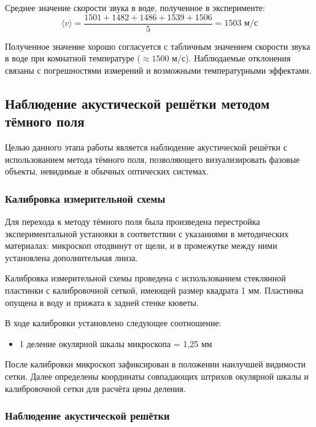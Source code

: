 Среднее значение скорости звука в воде, полученное в эксперименте:
\begin{equation}
    \langle v \rangle = \frac{1501 + 1482 + 1486 + 1539 + 1506}{5} = 1503 \text{ м/с}
\end{equation}

Полученное значение хорошо согласуется с табличным значением скорости звука в воде при комнатной температуре ($\approx 1500$ м/с). Наблюдаемые отклонения связаны с погрешностями измерений и возможными температурными эффектами.

\subsection{Наблюдение акустической решётки методом тёмного поля}

Целью данного этапа работы является наблюдение акустической решётки с использованием метода тёмного поля, позволяющего визуализировать фазовые объекты, невидимые в обычных оптических системах.

\subsubsection{Калибровка измерительной схемы}

Для перехода к методу тёмного поля была произведена перестройка экспериментальной установки в соответствии с указаниями в методических материалах: микроскоп отодвинут от щели, и в промежутке между ними установлена дополнительная линза. 

Калибровка измерительной схемы проведена с использованием стеклянной пластинки с калибровочной сеткой, имеющей размер квадрата 1 мм. Пластинка опущена в воду и прижата к задней стенке кюветы.

В ходе калибровки установлено следующее соотношение:
\begin{itemize}
    \item 1 деление окулярной шкалы микроскопа = 1,25 мм
\end{itemize}

После калибровки микроскоп зафиксирован в положении наилучшей видимости сетки. Далее определены координаты совпадающих штрихов окулярной шкалы и калибровочной сетки для расчёта цены деления.

\subsubsection{Наблюдение акустической решётки}


